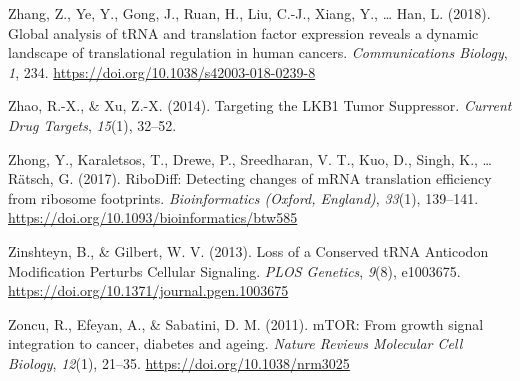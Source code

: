 \documentclass[12pt,openany]{book}
\begin{document}
\hypertarget{ref-Zhang2018}{}
Zhang, Z., Ye, Y., Gong, J., Ruan, H., Liu, C.-J., Xiang, Y., \ldots{}
Han, L. (2018). Global analysis of tRNA and translation factor
expression reveals a dynamic landscape of translational regulation in
human cancers. \emph{Communications Biology}, \emph{1}, 234.
\url{https://doi.org/10.1038/s42003-018-0239-8}

\hypertarget{ref-Zhao2014}{}
Zhao, R.-X., \& Xu, Z.-X. (2014). Targeting the LKB1 Tumor Suppressor.
\emph{Current Drug Targets}, \emph{15}(1), 32--52.

\hypertarget{ref-Zhong2017}{}
Zhong, Y., Karaletsos, T., Drewe, P., Sreedharan, V. T., Kuo, D., Singh,
K., \ldots{} Rätsch, G. (2017). RiboDiff: Detecting changes of mRNA
translation efficiency from ribosome footprints. \emph{Bioinformatics
(Oxford, England)}, \emph{33}(1), 139--141.
\url{https://doi.org/10.1093/bioinformatics/btw585}

\hypertarget{ref-Zinshteyn2013}{}
Zinshteyn, B., \& Gilbert, W. V. (2013). Loss of a Conserved tRNA
Anticodon Modification Perturbs Cellular Signaling. \emph{PLOS
Genetics}, \emph{9}(8), e1003675.
\url{https://doi.org/10.1371/journal.pgen.1003675}

\hypertarget{ref-Zoncu2011}{}
Zoncu, R., Efeyan, A., \& Sabatini, D. M. (2011). mTOR: From growth
signal integration to cancer, diabetes and ageing. \emph{Nature Reviews
Molecular Cell Biology}, \emph{12}(1), 21--35.
\url{https://doi.org/10.1038/nrm3025}
\end{document}
